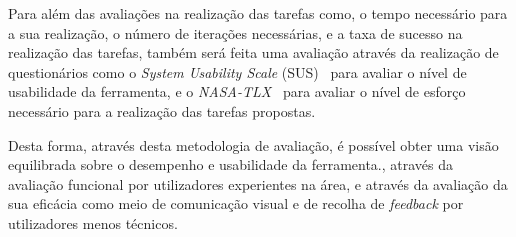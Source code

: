 Para além das avaliações na realização das tarefas como, o tempo necessário para a sua realização, o número de iterações necessárias, e a taxa de sucesso na realização das tarefas, também será feita uma avaliação através da realização de questionários como o \textit{System Usability Scale} (SUS)~\cite{brooke1996sus} para avaliar o nível de usabilidade da ferramenta, e o \textit{NASA-TLX}~\cite{hart1988development} para avaliar o nível de esforço necessário para a realização das tarefas propostas.

Desta forma, através desta metodologia de avaliação, é possível obter uma visão equilibrada sobre o desempenho e usabilidade da ferramenta., através da avaliação funcional por utilizadores experientes na área, e através da avaliação da sua eficácia como meio de comunicação visual e de recolha de \textit{feedback} por utilizadores menos técnicos.

